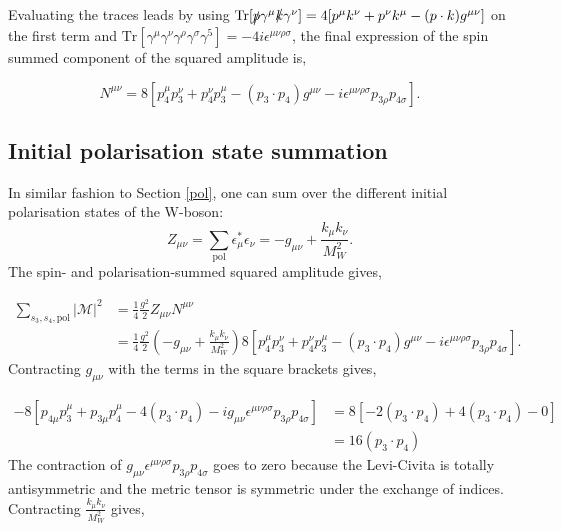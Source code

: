 \documentclass[a4paper,11pt]{article}
\begin{document}
  
 Evaluating the traces leads by using $ \text{Tr}[\slashed{p}\gamma^\mu \slashed{k} \gamma^\nu] = 4[p^\mu k^\nu + p^\nu k^\mu - (p \cdot k) g^{\mu \nu}]$ on the first term and $\text{Tr}[\gamma^\mu \gamma^\nu \gamma^\rho \gamma^\sigma \gamma^5] = -4i\epsilon^{\mu \nu \rho \sigma}$, the final expression of the spin summed component of the squared amplitude is,
 
 $$
 N^{\mu\nu}= 8[p_4^\mu p_3^\nu + p_4^\nu p_3^\mu - (p_3 \cdot p_4) g^{\mu \nu} -i \epsilon^{\mu \nu \rho \sigma}p_{3\rho}p_{4\sigma}].
 $$
 
 \subsection{Initial polarisation state summation}\label{sum-over-initial-pol-states}
 In similar fashion to Section \ref{pol}, one can sum over the different initial polarisation states of the W-boson:
 \begin{equation}
 	Z_{\mu\nu}= \sum_\text{pol} \epsilon_\mu^* \epsilon_\nu=  -g_{\mu\nu} + \frac{k_\mu k_\nu}{M_W^2}.
 \end{equation}
The spin- and  polarisation-summed squared amplitude gives,

\begin{equation}
	\begin{aligned}
			\sum_{s_3, s_4, \text{pol}}|\mathcal{M}|^2&=  \frac{1}{4} \frac{g^2}{2} Z_{\mu\nu}N^{\mu\nu}\\
			&= \frac{1}{4} \frac{g^2}{2}   \left(-g_{\mu\nu} + \frac{k_\mu k_\nu}{M_W^2}\right) 8[p_4^\mu p_3^\nu + p_4^\nu p_3^\mu - (p_3 \cdot p_4) g^{\mu \nu} - i\epsilon^{\mu \nu \rho \sigma}p_{3\rho}p_{4\sigma}].
	\end{aligned}
\end{equation}
Contracting $g_{\mu \nu}$ with the terms in the square brackets gives,

\begin{equation}
	\begin{aligned}
		-8[p_{4\mu}p_3^\mu + p_{3\mu}p_4^\mu -4(p_3 \cdot p_4) -ig_{\mu\nu}\epsilon^{\mu \nu \rho \sigma}p_{3\rho}p_{4\sigma}] &= 8[-2(p_3 \cdot p_4) + 4(p_3 \cdot p_4)- 0] \\
		&= 16(p_3 \cdot p_4)
	\end{aligned}
\end{equation}
The contraction of $g_{\mu\nu}\epsilon^{\mu \nu \rho \sigma}p_{3\rho}p_{4\sigma}$ goes to zero because the Levi-Civita is totally antisymmetric and the metric tensor is symmetric under the exchange of indices. Contracting $\frac{k_\mu k_\nu}{M_W^2}$ gives, 
\end{document}
